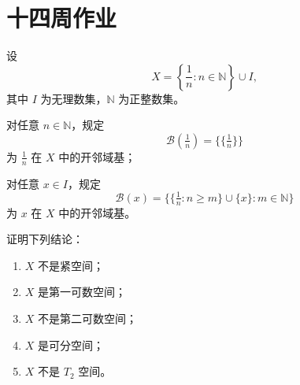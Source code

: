 \section{十四周作业}
\begin{homework}[13]
设
\[
X=\left\{\frac{1}{n}:n\in\mathbb{N}\right\}\cup I,
\]
其中 $I$ 为无理数集，$\mathbb{N}$ 为正整数集。

对任意 $n\in\mathbb{N}$，规定
\[
\mathcal{B}\!\left(\tfrac{1}{n}\right)=\bigl\{\{\tfrac{1}{n}\}\bigr\}
\]
为 $\tfrac{1}{n}$ 在 $X$ 中的开邻域基；

对任意 $x\in I$，规定
\[
\mathcal{B}(x)
=
\bigl\{\{\tfrac{1}{n}:n\ge m\}\cup\{x\}:m\in\mathbb{N}\bigr\}
\]
为 $x$ 在 $X$ 中的开邻域基。

证明下列结论：
\begin{enumerate}
  \item $X$ 不是紧空间；
  \item $X$ 是第一可数空间；
  \item $X$ 不是第二可数空间；
  \item $X$ 是可分空间；
  \item $X$ 不是 $T_2$ 空间。
\end{enumerate}
\end{homework}
